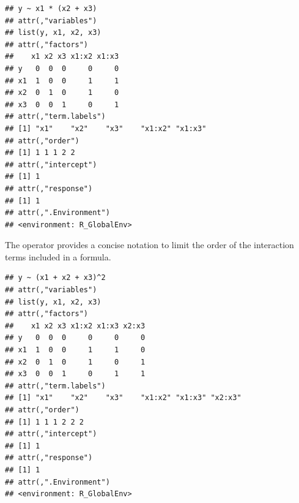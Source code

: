 \documentclass[krantz2]{krantz}\usepackage{knitr}
\begin{document}
\begin{knitrout}\footnotesize
{}\color{fgcolor}\begin{kframe}
\begin{alltt}
 \hlopt{~}  \hlopt{*}  \hlopt{+} 
\end{alltt}
\begin{verbatim}
## y ~ x1 * (x2 + x3)
## attr(,"variables")
## list(y, x1, x2, x3)
## attr(,"factors")
##    x1 x2 x3 x1:x2 x1:x3
## y   0  0  0     0     0
## x1  1  0  0     1     1
## x2  0  1  0     1     0
## x3  0  0  1     0     1
## attr(,"term.labels")
## [1] "x1"    "x2"    "x3"    "x1:x2" "x1:x3"
## attr(,"order")
## [1] 1 1 1 2 2
## attr(,"intercept")
## [1] 1
## attr(,"response")
## [1] 1
## attr(,".Environment")
## <environment: R_GlobalEnv>
\end{verbatim}
\end{kframe}
\end{knitrout}

The \code{\textasciicircum{}} operator provides a concise notation to limit the order of the interaction terms included in a formula.

\begin{knitrout}\footnotesize
{}\color{fgcolor}\begin{kframe}
\begin{alltt}
 \hlopt{~}  \hlopt{+}  \hlopt{+} \hlopt{^}
 \hlopt{~}  \hlopt{+}  \hlopt{+}  \hlopt{+} \hlopt{:} \hlopt{+} \hlopt{:} \hlopt{+} \hlopt{:}
\end{alltt}
\end{kframe}
\end{knitrout}

\begin{knitrout}\footnotesize
{}\color{fgcolor}\begin{kframe}
\begin{alltt}
 \hlopt{~}  \hlopt{+}  \hlopt{+} \hlopt{^}\hlstd{)}
\end{alltt}
\begin{verbatim}
## y ~ (x1 + x2 + x3)^2
## attr(,"variables")
## list(y, x1, x2, x3)
## attr(,"factors")
##    x1 x2 x3 x1:x2 x1:x3 x2:x3
## y   0  0  0     0     0     0
## x1  1  0  0     1     1     0
## x2  0  1  0     1     0     1
## x3  0  0  1     0     1     1
## attr(,"term.labels")
## [1] "x1"    "x2"    "x3"    "x1:x2" "x1:x3" "x2:x3"
## attr(,"order")
## [1] 1 1 1 2 2 2
## attr(,"intercept")
## [1] 1
## attr(,"response")
## [1] 1
## attr(,".Environment")
## <environment: R_GlobalEnv>
\end{verbatim}
\end{kframe}
\end{knitrout}
\end{document}

